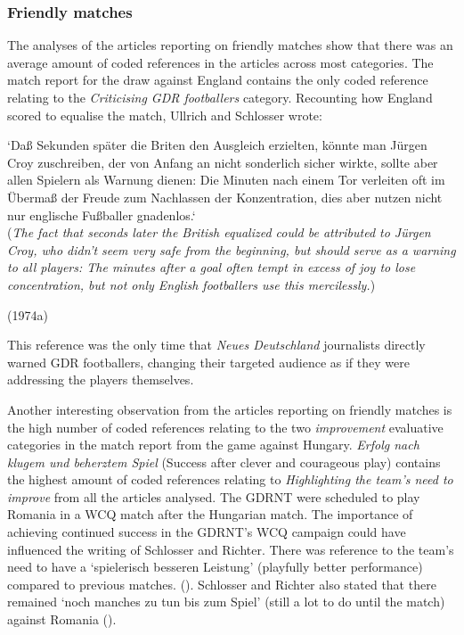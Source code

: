 \subsubsection*{Friendly matches}

The analyses of the articles reporting on friendly matches show that there was an average amount of coded references in the articles across most categories. The match report for the draw against England contains the only coded reference relating to the \textit{Criticising GDR footballers} category. Recounting how England scored to equalise the match, Ullrich and Schlosser wrote:

\begin{displayquote}
\begin{small}
‘Daß Sekunden später die Briten den Ausgleich erzielten, könnte man Jürgen Croy zuschreiben, der von Anfang an nicht sonderlich sicher wirkte, sollte aber allen Spielern als Warnung dienen: Die Minuten nach einem Tor verleiten oft im Übermaß der Freude zum Nachlassen der Konzentration, dies aber nutzen nicht nur englische Fußballer gnadenlos.‘\\
(\textit{The fact that seconds later the British equalized could be attributed to Jürgen Croy, who didn't seem very safe from the beginning, but should serve as a warning to all players: The minutes after a goal often tempt in excess of joy to lose concentration, but not only English footballers use this mercilessly.})\
\begin{flushright}\footnotesize (1974a)\end{flushright}
\end{small}
\end{displayquote}

This reference was the only time that \textit{Neues Deutschland} journalists directly warned GDR footballers, changing their targeted audience as if they were addressing the players themselves.

Another interesting observation from the articles reporting on friendly matches is the high number of coded references relating to the two \textit{improvement} evaluative categories in the match report from the game against Hungary. \textit{Erfolg nach klugem und beherztem Spiel} (Success after clever and courageous play) contains the highest amount of coded references relating to \textit{Highlighting the team’s need to improve} from all the articles analysed. The GDRNT were scheduled to play Romania in a WCQ match after the Hungarian match. The importance of achieving continued success in the GDRNT’s WCQ campaign could have influenced the writing of Schlosser and Richter. There was reference to the team’s need to have a ‘spielerisch besseren Leistung’ (playfully better performance) compared to previous matches. (\cite{nd19730517}). Schlosser and Richter also stated that there remained ‘noch manches zu tun bis zum Spiel’ (still a lot to do until the match) against Romania (\cite{nd19730517}).

